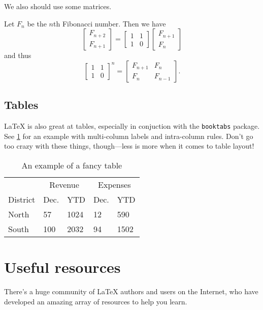 \documentclass[twoside]{memoir}
\newcommand{\code}[1]{\texttt{#1}}
\begin{document}
We also should use some matrices.
\begin{theorem*}
  Let $F_{n}$ be the $n$th Fibonacci number.
  Then we have
  \begin{equation*}
    \begin{bmatrix}
      F_{n+2} \\
      F_{n+1}
    \end{bmatrix} =
    \begin{bmatrix}
      1 & 1 \\
      1 & 0
    \end{bmatrix}
    \begin{bmatrix}
      F_{n+1} \\
      F_{n}
    \end{bmatrix}
  \end{equation*}
  and thus
  \begin{equation*}
    \begin{bmatrix}
      1 & 1 \\
      1 & 0
    \end{bmatrix}^{n} =
    \begin{bmatrix}
      F_{n+1} & F_{n} \\
      F_{n} & F_{n-1}
    \end{bmatrix}.
  \end{equation*}
\end{theorem*}

\section{Tables}
\LaTeX{} is also great at tables, especially in conjuction with the \code{booktabs} package.
See \cref{tab:example} for an example with multi-column labels and intra-column rules.
Don't go too crazy with these things, though---less is more when it comes to table layout!

\begin{table}[ph]
  \centering
  \begin{tabular}{l l l l l}
    \toprule
    & \multicolumn{2}{c}{Revenue} & \multicolumn{2}{c}{Expenses} \\
    \cmidrule(lr){2-3}
    \cmidrule(lr){4-5}
    District & Dec. & YTD & Dec. & YTD \\ \midrule
    North & 57 & 1024 & 12 & 590 \\
    South & 100 & 2032 & 94 & 1502 \\
    \bottomrule
  \end{tabular}
  \caption{An example of a fancy table}
  \label{tab:example}
\end{table}

\appendix
\chapter{Useful resources}
There's a huge community of \LaTeX{} authors and users on the Internet, who have developed an amazing array of resources to help you learn.

\backmatter
\printbibliography
\end{document}
